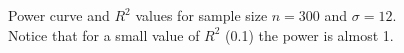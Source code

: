 \documentclass{article}
\begin{document}
\begin{figure}[hbtp]
   \centering
       \caption{Power curve and $R^2$ values for sample size $n =300$ and $\sigma = 12$. Notice that for a small value of $R^2$ (0.1) the power is almost 1.}
       \label{fig:power_rsq}
\end{figure}
\end{document}
